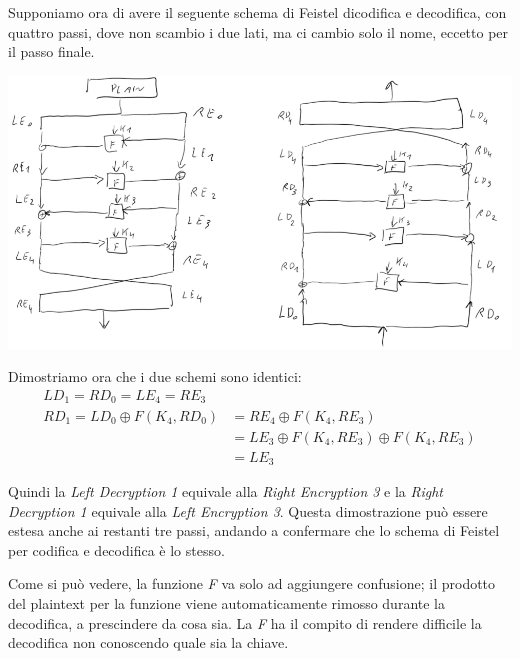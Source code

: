 \noindent Supponiamo ora di avere il seguente schema di Feistel dicodifica e decodifica, con quattro passi, dove non scambio i due lati, ma ci cambio solo il nome, eccetto per il passo finale.\\

\begin{center}
    \includegraphics[width=1\textwidth]{images/4.png}
\end{center}

\noindent Dimostriamo ora che i due schemi sono identici:
\begin{align*}
    LD_1 = RD_0 = LE_4 = RE_3\\
    RD_1 = LD_0 \oplus F(K_4, RD_0) &= RE_4 \oplus F(K_4, RE_3)\\
                                    &= LE_3 \oplus F(K_4, RE_3) \oplus F(K_4, RE_3)\\
                                    &= LE_3
\end{align*}      

\noindent Quindi la \textit{Left Decryption 1} equivale alla \textit{Right Encryption 3} e la \textit{Right Decryption 1} equivale alla \textit{Left Encryption 3}. Questa dimostrazione può essere estesa anche ai restanti tre passi, andando a confermare che lo schema di Feistel per codifica e decodifica è lo stesso. 

Come si può vedere, la funzione \textit{F} va solo ad aggiungere confusione; il prodotto del plaintext per la funzione viene automaticamente rimosso durante la decodifica, a prescindere da cosa sia. La \textit{F} ha il compito di rendere difficile la decodifica non conoscendo quale sia la chiave. 

